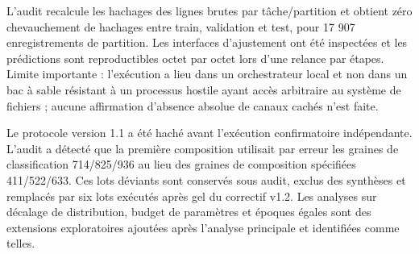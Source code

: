 \documentclass[11pt,a4paper]{article}
\begin{document}
L'audit recalcule les hachages des lignes brutes par tâche/partition et obtient zéro chevauchement de hachages entre train, validation et test, pour 17 907 enregistrements de partition. Les interfaces d'ajustement ont été inspectées et les prédictions sont reproductibles octet par octet lors d'une relance par étapes. Limite importante : l'exécution a lieu dans un orchestrateur local et non dans un bac à sable résistant à un processus hostile ayant accès arbitraire au système de fichiers ; aucune affirmation d'absence absolue de canaux cachés n'est faite.

Le protocole version 1.1 a été haché avant l'exécution confirmatoire indépendante. L'audit a détecté que la première composition utilisait par erreur les graines de classification 714/825/936 au lieu des graines de composition spécifiées 411/522/633. Ces lots déviants sont conservés sous audit, exclus des synthèses et remplacés par six lots exécutés après gel du correctif v1.2. Les analyses sur décalage de distribution, budget de paramètres et époques égales sont des extensions exploratoires ajoutées après l'analyse principale et identifiées comme telles.
\end{document}
